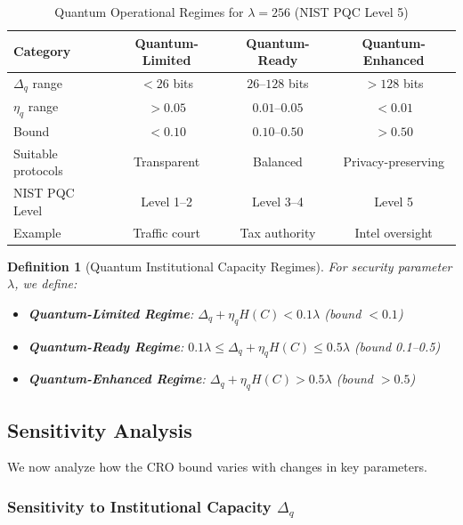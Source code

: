 \documentclass{ieeeaccess}
\newtheorem{definition}{Definition}[section]
\begin{document}
\begin{table}[h]
\centering
\caption{Quantum Operational Regimes for $\lambda = 256$ (NIST PQC Level 5)}
\label{tab:regimes}
\setlength{\tabcolsep}{3pt} %
\begin{tabular}{p{2.0cm}ccc} %
\toprule
\textbf{Category} & \textbf{Quantum-Limited} & \textbf{Quantum-Ready} & \textbf{Quantum-Enhanced} \\
\midrule
$\Delta_q$ range & $< 26$ bits & $26$--$128$ bits & $> 128$ bits \\
$\eta_q$ range & $> 0.05$ & $0.01$--$0.05$ & $< 0.01$ \\
Bound & $< 0.10$ & $0.10$--$0.50$ & $> 0.50$ \\
\midrule
Suitable protocols & Transparent & Balanced & Privacy-preserving \\
NIST PQC Level & Level 1--2 & Level 3--4 & Level 5 \\
Example & Traffic court & Tax authority & Intel oversight \\
\bottomrule
\end{tabular}
\end{table}

\begin{definition}[Quantum Institutional Capacity Regimes]
For security parameter $\lambda$, we define:
\begin{itemize}
    \item \textbf{Quantum-Limited Regime}: $\Delta_q + \eta_q H(C) < 0.1\lambda$ (bound $< 0.1$)
    \item \textbf{Quantum-Ready Regime}: $0.1\lambda \leq \Delta_q + \eta_q H(C) \leq 0.5\lambda$ (bound 0.1--0.5)
    \item \textbf{Quantum-Enhanced Regime}: $\Delta_q + \eta_q H(C) > 0.5\lambda$ (bound $> 0.5$)
\end{itemize}
\end{definition}

\subsection{Sensitivity Analysis}

We now analyze how the CRO bound varies with changes in key parameters.

\subsubsection{Sensitivity to Institutional Capacity $\Delta_q$}
\end{document}
